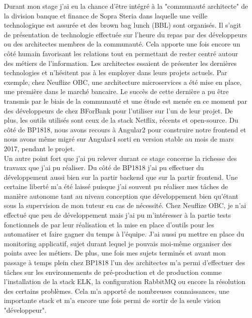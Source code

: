 \begin{changemargin}{-1cm}{-1cm}
	Durant mon stage j'ai eu la chance d'être intégré à la "communauté architecte" de la division banque et finance de Sopra Steria dans laquelle une veille technologique est assurée et des brown bag lunch (BBL) sont organisés. Il s'agit de présentation de technologie effectuée sur l'heure du repas par des développeurs ou des architectes membres de la communauté. Cela apporte une fois encore un côté humain favorisant les relations tout en permettant de rester centré autour des métiers de l'information. Les architectes essaient de présenter les dernières technologies et n'hésitent pas à les employer dans leurs projets actuels. Par exemple, chez Neuflize OBC, une architecture microservices a été mise en place, une première dans le marché bancaire. Le succès de cette dernière a pu être transmis par le biais de la communauté et une étude est menée en ce moment par des développeurs de chez BForBank pour l'utiliser sur l'un de leur projet. De plus, les outils utilisés sont ceux de la stack Netflix, récents et open-source. Du côté de BP1818, nous avons recours à Angular2 pour construire notre frontend et nous avons même migré sur Angular4 sorti en version stable au mois de mars 2017, pendant le projet. \\
	
	Un autre point fort que j'ai pu relever durant ce stage concerne la richesse des travaux que j'ai pu réaliser. Du côté de BP1818 j'ai pu effectuer du développement aussi bien sur la partir backend que sur la partir frontend. Une certaine liberté m'a été laissé puisque j'ai souvent pu réaliser mes tâches de manière autonome tant au niveau conception que développement bien qu'étant sous la supervision de mon tuteur en cas de nécessité. Chez Neuflize OBC, je n'ai effectué que peu de développement mais j'ai pu m'intéresser à la partie tests fonctionnels de par leur réalisation et la mise en place d'outils pour les automatiser et faire gagner du temps à l'équipe. J'ai aussi pu mettre en place du monitoring applicatif, sujet durant lequel je pouvais moi-même organiser des points avec les métiers. De plus, une fois mes sujets terminés et avant mon passage à temps plein chez BP1818 l'un des architectes m'a permi d'effectuer des tâches sur les environnements de pré-production et de production comme l'installation de la stack ELK, la configuration RabbitMQ ou encore la résolution des certains problèmes. Cela m'a apporté de nombreuses connaissances, une importante stack et m'a encore une fois permi de sortir de la seule vision "développeur". \\
	

\end{changemargin}
